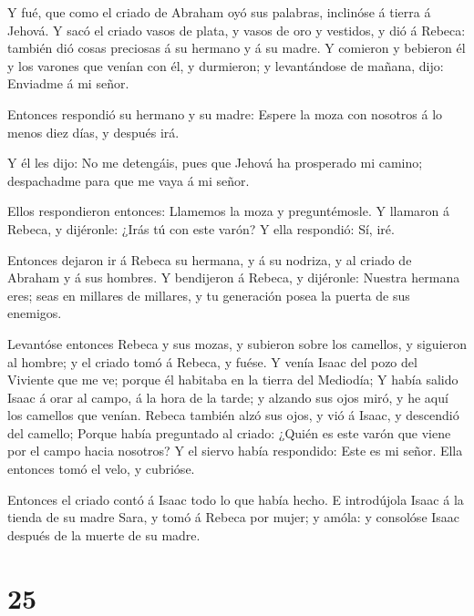  Y fué, que como el criado de Abraham oyó sus palabras,
inclinóse á tierra á Jehová.  Y sacó el criado vasos de
plata, y vasos de oro y vestidos, y dió á Rebeca: también dió cosas
preciosas á su hermano y á su madre.  Y comieron y bebieron
él y los varones que venían con él, y durmieron; y levantándose de
mañana, dijo: Enviadme á mi señor.

 Entonces respondió su hermano y su madre: Espere la moza
con nosotros á lo menos diez días, y después irá.

 Y él les dijo: No me detengáis, pues que Jehová ha
prosperado mi camino; despachadme para que me vaya á mi señor.

 Ellos respondieron entonces: Llamemos la moza y
preguntémosle.  Y llamaron á Rebeca, y dijéronle: ¿Irás tú
con este varón? Y ella respondió: Sí, iré.

 Entonces dejaron ir á Rebeca su hermana, y á su nodriza, y
al criado de Abraham y á sus hombres.  Y bendijeron á
Rebeca, y dijéronle: Nuestra hermana eres; seas en millares de millares,
y tu generación posea la puerta de sus enemigos.

 Levantóse entonces Rebeca y sus mozas, y subieron sobre
los camellos, y siguieron al hombre; y el criado tomó á Rebeca, y fuése.
 Y venía Isaac del pozo del Viviente que me ve; porque él
habitaba en la tierra del Mediodía;  Y había salido Isaac á
orar al campo, á la hora de la tarde; y alzando sus ojos miró, y he aquí
los camellos que venían.  Rebeca también alzó sus ojos, y
vió á Isaac, y descendió del camello;  Porque había
preguntado al criado: ¿Quién es este varón que viene por el campo hacia
nosotros? Y el siervo había respondido: Este es mi señor. Ella entonces
tomó el velo, y cubrióse.

 Entonces el criado contó á Isaac todo lo que había hecho.
 E introdújola Isaac á la tienda de su madre Sara, y tomó á
Rebeca por mujer; y amóla: y consolóse Isaac después de la muerte de su
madre.

\hypertarget{section-24}{%
\section{25}\label{section-24}}

